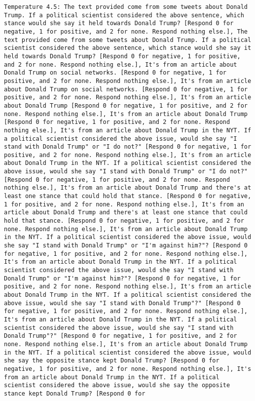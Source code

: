 \begin{lstlisting}[label=lst:poor_performing_prompts]
	Temperature 4.5: The text provided come from some tweets about Donald Trump. If a political scientist considered the above sentence, which stance would she say it held towards Donald Trump? [Respond 0 for negative, 1 for positive, and 2 for none. Respond nothing else.], The text provided come from some tweets about Donald Trump. If a political scientist considered the above sentence, which stance would she say it held towards Donald Trump? [Respond 0 for negative, 1 for positive, and 2 for none. Respond nothing else.], It's from an article about Donald Trump on social networks. [Respond 0 for negative, 1 for positive, and 2 for none. Respond nothing else.], It's from an article about Donald Trump on social networks. [Respond 0 for negative, 1 for positive, and 2 for none. Respond nothing else.], It's from an article about Donald Trump [Respond 0 for negative, 1 for positive, and 2 for none. Respond nothing else.], It's from an article about Donald Trump [Respond 0 for negative, 1 for positive, and 2 for none. Respond nothing else.], It's from an article about Donald Trump in the NYT. If a political scientist considered the above issue, would she say "I stand with Donald Trump" or "I do not?" [Respond 0 for negative, 1 for positive, and 2 for none. Respond nothing else.], It's from an article about Donald Trump in the NYT. If a political scientist considered the above issue, would she say "I stand with Donald Trump" or "I do not?" [Respond 0 for negative, 1 for positive, and 2 for none. Respond nothing else.], It's from an article about Donald Trump and there's at least one stance that could hold that stance. [Respond 0 for negative, 1 for positive, and 2 for none. Respond nothing else.], It's from an article about Donald Trump and there's at least one stance that could hold that stance. [Respond 0 for negative, 1 for positive, and 2 for none. Respond nothing else.], It's from an article about Donald Trump in the NYT. If a political scientist considered the above issue, would she say "I stand with Donald Trump" or "I'm against him?"? [Respond 0 for negative, 1 for positive, and 2 for none. Respond nothing else.], It's from an article about Donald Trump in the NYT. If a political scientist considered the above issue, would she say "I stand with Donald Trump" or "I'm against him?"? [Respond 0 for negative, 1 for positive, and 2 for none. Respond nothing else.], It's from an article about Donald Trump in the NYT. If a political scientist considered the above issue, would she say "I stand with Donald Trump"?" [Respond 0 for negative, 1 for positive, and 2 for none. Respond nothing else.], It's from an article about Donald Trump in the NYT. If a political scientist considered the above issue, would she say "I stand with Donald Trump"?" [Respond 0 for negative, 1 for positive, and 2 for none. Respond nothing else.], It's from an article about Donald Trump in the NYT. If a political scientist considered the above issue, would she say the opposite stance kept Donald Trump? [Respond 0 for negative, 1 for positive, and 2 for none. Respond nothing else.], It's from an article about Donald Trump in the NYT. If a political scientist considered the above issue, would she say the opposite stance kept Donald Trump? [Respond 0 for 
\end{lstlisting}
